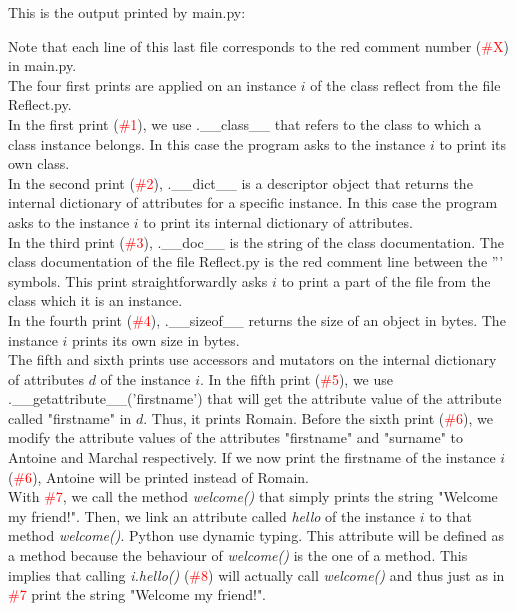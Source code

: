 This is the output printed by main.py:

Note that each line of this last file corresponds to the red comment number (\textcolor{red}{\#X}) in main.py.\\ 

The four first prints are applied on an instance $i$ of the class reflect from the file Reflect.py.\\
In the first print (\textcolor{red}{\#1}), we use .\_\_class\_\_ that refers to the class to which a class instance belongs. In this case the program asks to the instance $i$ to print its own class.\\
In the second print (\textcolor{red}{\#2}), .\_\_dict\_\_ is a descriptor object that returns the internal dictionary of attributes for a specific instance. In this case the program asks to the instance $i$ to print its internal dictionary of attributes.\\
In the third print (\textcolor{red}{\#3}), .\_\_doc\_\_ is the string of the class documentation. The class documentation of the file Reflect.py is the red comment line between the ''' symbols. This print straightforwardly asks $i$ to print a part of the file from the class which it is an instance.\\ 
In the fourth print (\textcolor{red}{\#4}), .\_\_sizeof\_\_ returns the size of an object in bytes. The instance $i$ prints its own size in bytes.\\

The fifth and sixth prints use accessors and mutators on the internal dictionary of attributes $d$ of the instance $i$.
In the fifth print (\textcolor{red}{\#5}), we use .\_\_getattribute\_\_('firstname') that will get the attribute value of the attribute called "firstname" in $d$. Thus, it prints Romain.
Before the sixth print (\textcolor{red}{\#6}), we modify the attribute values of the attributes "firstname" and "surname" to Antoine and Marchal respectively. If we now print the firstname of the instance $i$ (\textcolor{red}{\#6}), Antoine will be printed instead of Romain.\\

With \textcolor{red}{\#7}, we call the method \emph{welcome()} that simply prints the string "Welcome my friend!". Then, we link an attribute called \emph{hello} of the instance $i$ to that method \emph{welcome()}. Python use dynamic typing. This attribute will be defined as a method because the behaviour of \emph{welcome()} is the one of a method. This implies that calling \emph{i.hello()} (\textcolor{red}{\#8}) will actually call \emph{welcome()} and thus just as in \textcolor{red}{\#7} print the string "Welcome my friend!".\\

